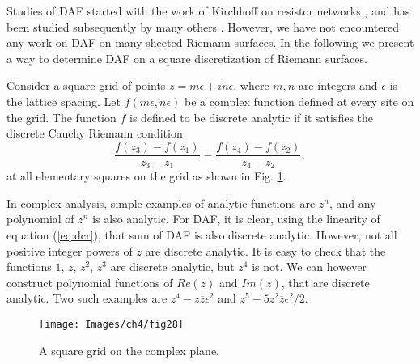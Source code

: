\documentclass[11pt,a4paper]{book}
\begin{document}
Studies of DAF started with the work of Kirchhoff on resistor
networks \cite{hu,cserti,Doyle}, and has been studied subsequently by many others
\cite{duffin,mercat}. However, we have not encountered any work on DAF
on many sheeted Riemann surfaces. In the following we present
a way to determine DAF on a square discretization of
Riemann surfaces.

Consider a square grid of points $z=m \epsilon+in\epsilon$, where $m,n$ are
integers and $\epsilon$ is the lattice spacing. Let $f\left(
m\epsilon, n\epsilon \right)$ be a complex function
defined at every site on the grid.
The function $f$ is defined to be discrete analytic
\cite{laszlo} if it satisfies
the discrete Cauchy Riemann condition
\begin{equation}
\frac{f\left(z_{3}\right)-f\left(z_{1}\right)}{z_{3}-z_{1}}=\frac{f\left(z_{4}\right)-f\left(z_{2}\right)}{z_{4}-z_{2}},
\label{eq:dcr}
\end{equation}
at all elementary squares on the grid as shown in Fig. \ref{fig:square}.

In complex analysis, simple examples of analytic functions are
$z^{n}$, and any polynomial of $z^{n}$ is also analytic. For
DAF, it is clear, using the linearity of equation (\ref{eq:dcr}), that
sum of DAF is also discrete analytic. However, not all positive integer powers of
$z$ are discrete analytic. It is easy to check that the functions
$1$, $z$, $z^{2}$, $z^{3}$ are discrete analytic, but $z^{4}$ is not.
We can however construct polynomial functions of $Re(z)$ and
$Im(z)$, that are discrete analytic. Two such examples are
$z^{4}-z\overline{z}\epsilon^{2}$ and $z^{5}-5 z^{2}\overline{z}\epsilon^{2}/2$.
\begin{figure}
\begin{center}
\texttt{[image: Images/ch4/fig28]}
\caption{\label{fig:square} A square grid on the complex plane.}
\end{center}
\end{figure}
\end{document}
